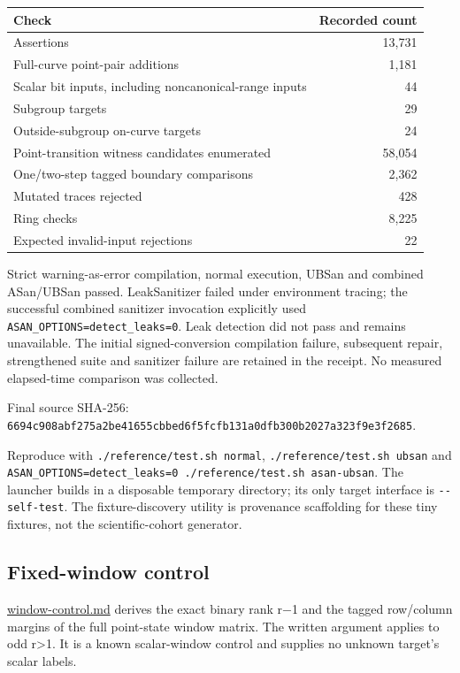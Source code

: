 \documentclass[
  10pt,
]{article}
\begin{document}
\begin{longtable}[]{@{}lr@{}}
\toprule\noalign{}
Check & Recorded count \\
\midrule\noalign{}
\endhead
\bottomrule\noalign{}
\endlastfoot
Assertions & 13,731 \\
Full-curve point-pair additions & 1,181 \\
Scalar bit inputs, including noncanonical-range inputs & 44 \\
Subgroup targets & 29 \\
Outside-subgroup on-curve targets & 24 \\
Point-transition witness candidates enumerated & 58,054 \\
One/two-step tagged boundary comparisons & 2,362 \\
Mutated traces rejected & 428 \\
Ring checks & 8,225 \\
Expected invalid-input rejections & 22 \\
\end{longtable}

Strict warning-as-error compilation, normal execution, UBSan and
combined ASan/UBSan passed. LeakSanitizer failed under environment
tracing; the successful combined sanitizer invocation explicitly used
\texttt{ASAN\_OPTIONS=detect\_leaks=0}. Leak detection did not pass and
remains unavailable. The initial signed-conversion compilation failure,
subsequent repair, strengthened suite and sanitizer failure are retained
in the receipt. No measured elapsed-time comparison was collected.

Final source SHA-256:
\texttt{6694c908abf275a2be41655cbbed6f5fcfb131a0dfb300b2027a323f9e3f2685}.

Reproduce with \texttt{./reference/test.sh\ normal},
\texttt{./reference/test.sh\ ubsan} and
\texttt{ASAN\_OPTIONS=detect\_leaks=0\ ./reference/test.sh\ asan-ubsan}.
The launcher builds in a disposable temporary directory; its only target
interface is \texttt{-\/-self-test}. The fixture-discovery utility is
provenance scaffolding for these tiny fixtures, not the
scientific-cohort generator.

\subsection{Fixed-window control}\label{fixed-window-control}

\url{window-control.md} derives the exact binary rank r−1 and the tagged
row/column margins of the full point-state window matrix. The written
argument applies to odd r\textgreater1. It is a known scalar-window
control and supplies no unknown target's scalar labels.
\end{document}
